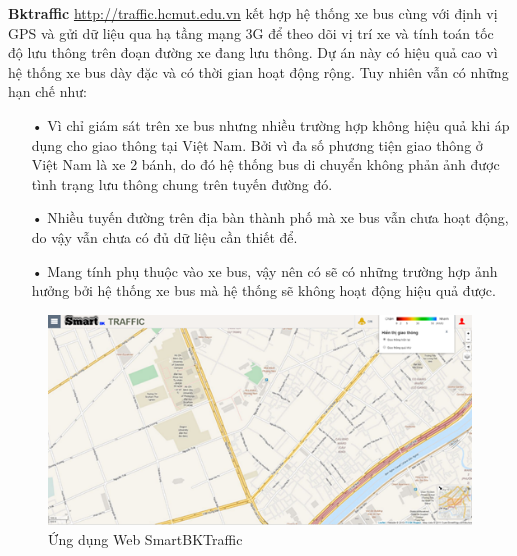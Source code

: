 \textbf{Bktraffic}  \url{http://traffic.hcmut.edu.vn} kết hợp hệ thống xe bus cùng với định vị GPS và gửi dữ liệu qua hạ tầng mạng 3G để theo dõi vị trí xe và tính toán tốc độ lưu thông trên đoạn đường xe đang lưu thông. Dự án này có hiệu quả cao vì hệ thống xe bus dày đặc và có thời gian hoạt động rộng. Tuy nhiên vẫn có những hạn chế như:
\begin{itemize}
\item[•]Vì chỉ giám sát trên xe bus nhưng nhiều trường hợp không hiệu quả khi áp dụng cho giao thông tại Việt Nam. Bởi vì đa số phương tiện giao thông ở Việt Nam là xe 2 bánh, do đó hệ thống bus di chuyển không phản ảnh được tình trạng lưu thông chung trên tuyến đường đó.
\item[•]Nhiều tuyến đường trên địa bàn thành phố mà xe bus vẫn chưa hoạt động, do vậy vẫn chưa có đủ dữ liệu cần thiết để.
\item[•]Mang tính phụ thuộc vào xe bus, vậy nên có sẽ có những trường hợp ảnh hưởng bởi hệ thống xe bus mà hệ thống sẽ không hoạt động hiệu quả được.
\end{itemize}

\begin{figure}[htbp!] 
\centering    
\includegraphics[width=1.0\textwidth]{pic2}
\caption[Ứng dụng Web SmartBKTraffic ]{ Ứng dụng Web SmartBKTraffic}
\label{fig:pic2}
\end{figure}




